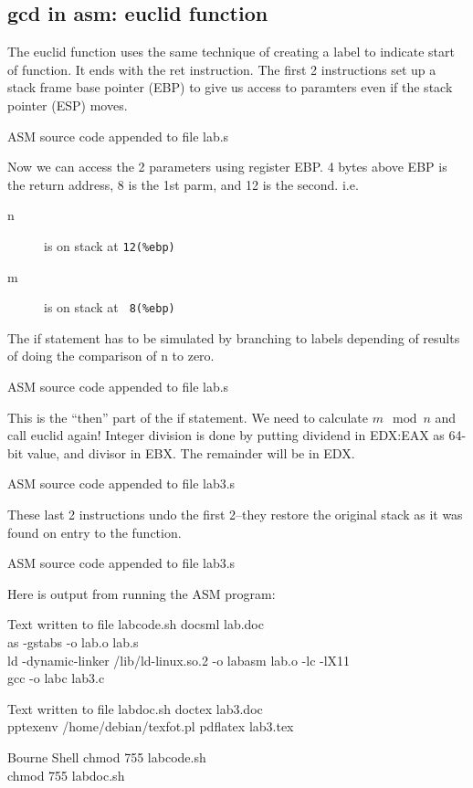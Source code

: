 \documentclass{article}
\begin{document}
\clearpage\subsection{gcd in asm: euclid function}
The euclid function uses the same technique of creating a label to indicate start of function. It ends with the ret instruction. The first 2 instructions set up a stack frame base pointer (EBP) to give us access to paramters even if the stack pointer (ESP) moves.
\begin{GFT}{ASM source code appended to file lab.s}
\end{GFT}
Now we can access the 2 parameters using register EBP. 4 bytes above EBP is the return address, 8 is the 1st parm, and 12 is the second. i.e.
\begin{description}
\item[n] is on stack at \verb|12(%ebp)|
\item[m] is on stack at \verb| 8(%ebp)|
\end{description}
The if statement has to be simulated by branching to labels depending of results of doing the comparison of n to zero.
\begin{GFT}{ASM source code appended to file lab.s}
\end{GFT}
This is the ``then'' part of the if statement. We need to calculate $m \mod n$ and call euclid again!  Integer division is done by putting dividend in EDX:EAX as 64-bit value, and divisor in EBX. The remainder will be in EDX.
\begin{GFT}{ASM source code appended to file lab3.s}
\end{GFT}
\clearpage
These last 2 instructions undo the first 2--they restore the original stack as it was found on entry to the function.
\begin{GFT}{ASM source code appended to file lab3.s}
\end{GFT}
Here is output from running the ASM program:\\
\clearpage
\begin{GFT}{Text written to file labcode.sh}
\+docsml lab.doc\\
\+as -gstabs -o lab.o lab.s\\
\+ld -dynamic-linker /lib/ld-linux.so.2 -o labasm lab.o -lc -lX11\\
\+gcc -o labc lab3.c\\
\end{GFT}
\begin{GFT}{Text written to file labdoc.sh}
\+doctex lab3.doc\\
\+pptexenv /home/debian/texfot.pl pdflatex lab3.tex\\
\end{GFT}
\begin{GFT}{Bourne Shell}
\+chmod 755 labcode.sh\\
\+chmod 755 labdoc.sh\\
\end{GFT}
\end{document}
